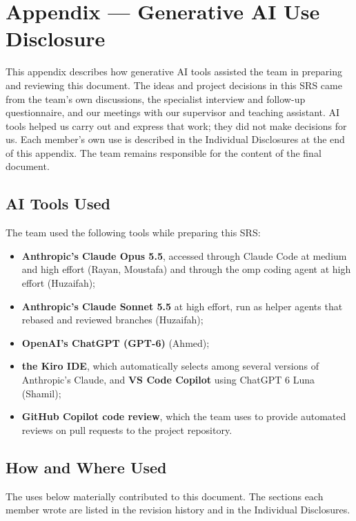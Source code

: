 \documentclass[12pt]{article}
\renewcommand{\_}{\textunderscore\allowbreak}%
\begin{document}
\newpage{}


\newpage{}
\section{Appendix --- Generative AI Use Disclosure}
\label{app:ai-use}

This appendix describes how generative AI tools assisted the team in
preparing and reviewing this document. The ideas and project decisions in
this SRS came from the team's own discussions, the specialist
interview and follow-up questionnaire, and our meetings with our supervisor
and teaching assistant. AI tools helped us carry out and express that work;
they did not make decisions for us. Each member's own use is described in
the Individual Disclosures at the end of this appendix. The team remains
responsible for the content of the final document.

\subsection{AI Tools Used}

The team used the following tools while preparing this SRS:

\begin{itemize}
  \item \textbf{Anthropic's Claude Opus 5.5}, accessed through Claude Code
  at medium and high effort (Rayan, Moustafa) and through the omp coding
  agent at high effort (Huzaifah);
  \item \textbf{Anthropic's Claude Sonnet 5.5} at high effort, run as
  helper agents that rebased and reviewed branches (Huzaifah);
  \item \textbf{OpenAI's ChatGPT (GPT-6)} (Ahmed);
  \item \textbf{the Kiro IDE}, which automatically selects among several
  versions of Anthropic's Claude, and \textbf{VS Code Copilot} using
  ChatGPT 6 Luna (Shamil);
  \item \textbf{GitHub Copilot code review}, which the team uses to provide
  automated reviews on pull requests to the project repository.
\end{itemize}

\subsection{How and Where Used}

The uses below materially contributed to this document. The sections each
member wrote are listed in the revision history and in the Individual
Disclosures.
\end{document}
